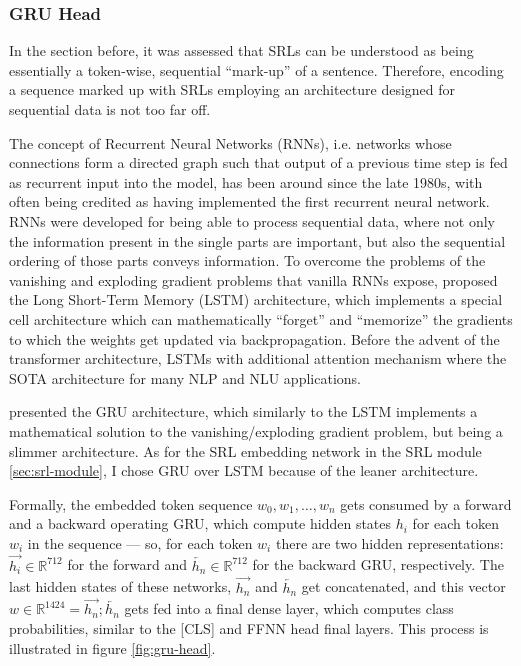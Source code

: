 \subsubsection{GRU Head}

In the section before, it was assessed that SRLs can be understood as being essentially a
token-wise, sequential ``mark-up'' of a sentence. Therefore, encoding a sequence marked up
with SRLs employing an architecture designed for sequential data is not too far off.


The concept of Recurrent Neural Networks (RNNs), i.e. networks whose connections form a directed
graph such that output of a previous time step is fed as recurrent input into the model, has been around since the
late 1980s, with \citep{hopfield1982neural} often being credited as having implemented the first
recurrent neural network. RNNs were developed for being able to process sequential data, where
not only the information present in the single parts are important, but also the sequential
ordering of those parts conveys information. To overcome the problems of the vanishing and exploding gradient
problems that vanilla RNNs expose, \citep{hochreiter1997long} proposed the Long Short-Term
Memory (LSTM) architecture, which implements a special cell architecture which can mathematically
``forget'' and ``memorize'' the gradients to which the weights get updated via backpropagation.
Before the advent of the transformer architecture, LSTMs with additional attention mechanism
where the SOTA architecture for many NLP and NLU applications.

\cite{cho2014learning} presented the GRU architecture, which similarly to the LSTM
implements a mathematical solution to the vanishing/exploding gradient problem, but
being a slimmer architecture. As for the SRL embedding network in the SRL module
\ref{sec:srl-module}, I chose GRU over LSTM because of the leaner architecture.

Formally, the embedded token sequence $w_0, w_1, \dotso , w_n$ gets consumed by a
forward and a backward operating GRU, which compute hidden states $h_i$ for each token
$w_i$ in the sequence --- so, for each token $w_i$ there are two hidden representations:
$\overrightarrow{h_i} \in \mathbb{R}^{712}$ for the forward and $\overleftarrow{h_n} \in
\mathbb{R}^{712}$ for the backward GRU, respectively. The last hidden states of these
networks, $\overrightarrow{h_n}$ and $\overleftarrow{h_n}$ get concatenated, and this
vector $w \in \mathbb{R}^{1424}= \overrightarrow{h_n} ; \overleftarrow{h_n}$ gets fed into a final dense
layer, which computes class probabilities, similar to the [CLS] and FFNN head final
layers. This
process is illustrated in figure \ref{fig:gru-head}.

